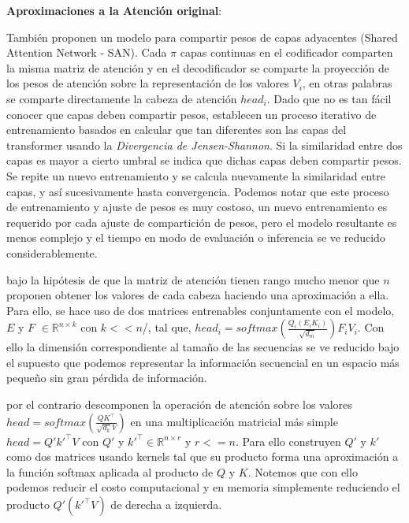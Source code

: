 \textbf{Aproximaciones a la Atención original}:

También \citeauthor{DBLP:journals/corr/abs-1906-11024} proponen un modelo para compartir pesos de capas
adyacentes (Shared Attention Network - SAN).
Cada $\pi$ capas continuas en el codificador comparten la misma matriz de atención y en el
decodificador se comparte la proyección de los pesos de atención sobre la representación de los
valores $V_i$, en otras palabras se comparte directamente la cabeza de atención $head_i$. Dado que no
es tan fácil conocer que capas deben compartir pesos, establecen un proceso iterativo
de entrenamiento basados en calcular que tan diferentes son las capas del transformer usando
la \textit{Divergencia de Jensen-Shannon}. Si la similaridad entre dos capas es mayor a cierto umbral
se indica que dichas capas deben compartir pesos. Se repite un nuevo entrenamiento y se calcula
nuevamente la similaridad entre capas, y así sucesivamente hasta convergencia. Podemos notar que este
proceso de entrenamiento y ajuste de pesos es muy costoso, un nuevo entrenamiento es requerido por
cada ajuste de compartición de pesos, pero el modelo resultante
es menos complejo y el tiempo en modo de evaluación o inferencia se ve reducido considerablemente.

\citeauthor{DBLP:journals/corr/abs-2006-04768} bajo la hipótesis de que la matriz de atención tienen
rango mucho menor que $n$ proponen obtener los valores de cada cabeza haciendo una aproximación a ella.
Para ello, se hace uso de dos matrices entrenables conjuntamente con el modelo, $E$ y $F$
$\in \mathbb{R}^{n \times k}$ con $k<<n$/, tal que,
$head_i = softmax(\frac{Q_i (E_i K_i)}{\sqrt{d_m}}) F_iV_i$. Con ello la dimensión correspondiente al
tamaño de las secuencias se ve reducido bajo el supuesto que podemos representar la información
secuencial en un espacio más pequeño sin gran pérdida de información.

\citeauthor{DBLP:journals/corr/abs-2009-14794} por el contrario descomponen la operación de atención
sobre los valores $head = softmax(\frac{QK^\top}{\sqrt{d_k} V})$ en una multiplicación matricial más simple
$head = Q'k'^\top V$ con $Q'$ y $k'^\top \in \mathbb{R}^{n \times r}$ y $r<=n$.
Para ello construyen $Q'$ y $k'$ como dos matrices usando kernels tal que su producto forma una
aproximación a la función softmax aplicada al producto de $Q$ y $K$. Notemos que con ello podemos
reducir el costo computacional y en
memoria simplemente reduciendo el producto $Q'(k'^\top V)$ de derecha a izquierda.

